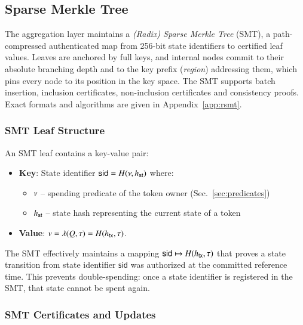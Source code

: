 \subsection{Sparse Merkle Tree}\label{sec:smt}

The aggregation layer maintains a \emph{(Radix) Sparse Merkle Tree} (SMT), a path-compressed authenticated map from 256-bit state identifiers to certified leaf values. Leaves are anchored by full keys, and internal nodes commit to their absolute branching depth and to the key prefix (\emph{region}) addressing them, which pins every node to its position in the key space. The SMT supports batch insertion, inclusion certificates, non-inclusion certificates and consistency proofs. Exact formats and algorithms are given in Appendix~\ref{app:rsmt}.


\subsubsection{SMT Leaf Structure}

An SMT leaf contains a key-value pair:
\begin{itemize}
	\item \textbf{Key}: State identifier $\mathsf{sid} = H(\nu, {h_\mathsf{st}})$ where:
	\begin{itemize}
		\item $\nu$ -- spending predicate of the token owner (Sec.~\ref{sec:predicates})
		\item ${h_\mathsf{st}}$ -- state hash representing the current state of a token
	\end{itemize}
	\item \textbf{Value}: $v=\lambda(Q,\tau)=H({h_\mathsf{tx}},\tau)$.
\end{itemize}

The SMT effectively maintains a mapping $\mathsf{sid} \mapsto H({h_\mathsf{tx}},\tau)$ that proves a state transition from state identifier $\mathsf{sid}$ was authorized at the committed reference time. This prevents double-spending: once a state identifier is registered in the SMT, that state cannot be spent again.

\subsubsection{SMT Certificates and Updates}\label{InclusionCert}

